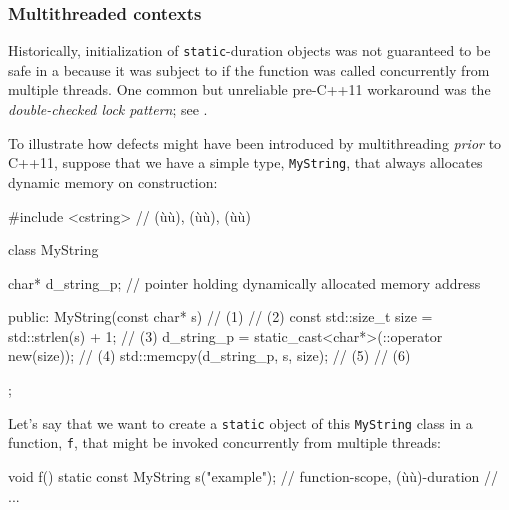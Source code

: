 \subsubsection[Multithreaded contexts]{Multithreaded contexts}\label{multithreaded-contexts}

Historically, initialization of 
\lstinline!static!-duration objects was not guaranteed to be safe in a
 because it was subject to  if the function was called concurrently from multiple threads.
One common but unreliable pre-C++11 workaround was the
\emph{double-checked lock pattern}; see .

To illustrate how defects might have been introduced by multithreading
\emph{prior} to C++11, suppose that we have a simple type,
\lstinline!MyString!, that always allocates dynamic memory on construction:

\begin{emcppslisting}[emcppsbatch=e4]
#include <cstring>  // (ù{}ù), (ù{}ù), (ù{}ù)

class MyString
{
    char* d_string_p;  // pointer holding dynamically allocated memory address

public:
    MyString(const char* s)                                     // (1)
    {                                                           // (2)
        const std::size_t size = std::strlen(s) + 1;            // (3)
        d_string_p = static_cast<char*>(::operator new(size));  // (4)
        std::memcpy(d_string_p, s, size);                       // (5)
    }                                                           // (6)
};
\end{emcppslisting}

\noindent Let's say that we want to create a \lstinline!static! object of this
\lstinline!MyString! class in a function, \lstinline!f!, that might be invoked
concurrently from multiple threads:

\begin{emcppslisting}[emcppsbatch=e4]
void f()
{
    static const MyString s("example");  // function-scope, (ù{}ù)-duration
    // ...
}
\end{emcppslisting}

